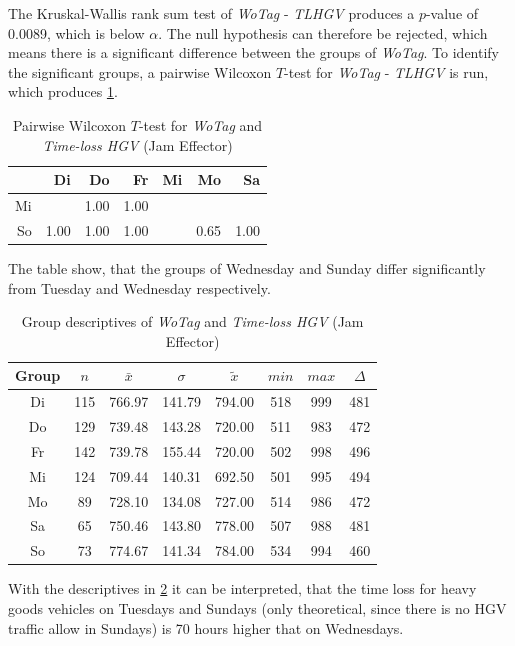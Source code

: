 The Kruskal-Wallis rank sum test of \textit{WoTag} - \textit{TLHGV} produces a $p$-value of 0.0089, which is below $\alpha$. The null hypothesis can therefore be rejected, which means there is a significant difference between the groups of \textit{WoTag}. To identify the significant groups, a pairwise Wilcoxon $T$-test for \textit{WoTag} - \textit{TLHGV} is run, which produces \cref{tbl:wilcoxon_baysis_effector_WoTag_TLHGV}. 
\begin{table}[ht!]
	\tiny
	\centering
    \begin{tabular}{rrrrrrr}
		\toprule
		   & Di & Do & Fr & Mi & Mo & Sa \\ 
		\midrule
		Mi & \red{0.03} & 1.00 & 1.00 &  &  &  \\ 
		So & 1.00 & 1.00 & 1.00 & \red{0.05} & 0.65 & 1.00 \\ 
		\bottomrule
	\end{tabular}
    \caption{Pairwise Wilcoxon $T$-test for \textit{WoTag} and \textit{Time-loss HGV} (Jam Effector)}
    \label{tbl:wilcoxon_baysis_effector_WoTag_TLHGV}
\end{table}
The table show, that the groups of Wednesday and Sunday differ significantly from Tuesday and Wednesday respectively.
\begin{table}[ht!]
	\tiny
	\centering
    \begin{tabular}{c|c|c|c|c|c|c|c}
		\toprule
		Group & $n$ & $\bar{x}$ & $\sigma$ & $\tilde{x}$ & $min$ & $max$ & $\Delta$ \\
		\midrule
		Di & 115 & 766.97 & 141.79 & 794.00 & 518 & 999 & 481 \\ 
		Do & 129 & 739.48 & 143.28 & 720.00 & 511 & 983 & 472 \\ 
		Fr & 142 & 739.78 & 155.44 & 720.00 & 502 & 998 & 496 \\ 
		Mi & 124 & 709.44 & 140.31 & 692.50 & 501 & 995 & 494 \\ 
		Mo & 89  & 728.10 & 134.08 & 727.00 & 514 & 986 & 472 \\ 
		Sa & 65  & 750.46 & 143.80 & 778.00 & 507 & 988 & 481 \\ 
		So & 73  & 774.67 & 141.34 & 784.00 & 534 & 994 & 460 \\ 
		\bottomrule
	\end{tabular}
    \caption{Group descriptives of \textit{WoTag} and \textit{Time-loss HGV} (Jam Effector)}
    \label{tbl:descriptives_baysis_effector_WoTag_TLHGV}
\end{table}
With the descriptives in \cref{tbl:descriptives_baysis_effector_WoTag_TLHGV} it can be interpreted, that the time loss for heavy goods vehicles on Tuesdays and Sundays (only theoretical, since there is no HGV traffic allow in Sundays) is 70 hours higher that on Wednesdays.

